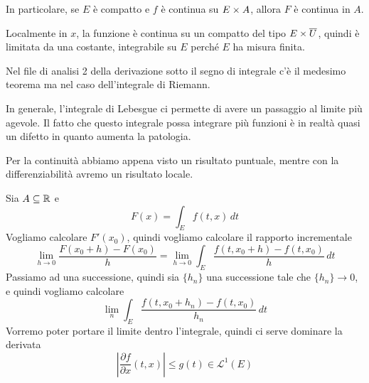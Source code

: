 \documentclass[a4paper]{article}
\begin{document}
\begin{radioactive}
\begin{snippetcorollary}{}
    In particolare, se \(E\) è compatto e \(f\) è continua su \(E\times A\),
    allora \(F\) è continua in \(A\).
\end{snippetcorollary}
\end{radioactive}

\begin{radioactive}
\begin{snippetproof}{}
    Localmente in \(x\), la funzione è continua su un compatto del tipo \(E\times\overline U\), quindi è limitata da una costante, integrabile su \(E\) perché \(E\) ha misura finita.
\end{snippetproof}
\end{radioactive}

\begin{radioactive}
Nel file di analisi 2 della derivazione sotto il segno di integrale c'è il medesimo
teorema ma nel caso dell'integrale di Riemann.
\end{radioactive}

\begin{radioactive}
In generale, l'integrale di Lebesgue
ci permette di avere un passaggio al limite più agevole.
Il fatto che questo integrale possa integrare più funzioni è in realtà quasi un difetto in quanto
aumenta la patologia.
\end{radioactive}

\begin{radioactive}
Per la continuità abbiamo appena visto un risultato puntuale,
mentre con la differenziabilità avremo un risultato locale.
\end{radioactive}

\begin{radioactive}
Sia \(A \subseteq \mathbb{R}\) e \[
    F(x) = \int_E f(t,x)\,dt
\]
Vogliamo calcolare \(F'(x_0)\), quindi vogliamo calcolare il rapporto incrementale
\[
    \lim_{h\to 0} \frac{F(x_0 + h)-F(x_0)}{h}
    = \lim_{h\to 0} \int_E \frac{f(t,x_0 + h)-f(t,x_0)}{h}\,dt
\]
Passiamo ad una successione, quindi sia \(\{h_n\}\) una successione tale che \(\{h_n\} \to 0\),
e quindi vogliamo calcolare
\[
    \lim_n \int_E \frac{f(t, x_0 + h_n) - f(t, x_0)}{h_n}\,dt
\]
Vorremo poter portare il limite dentro l'integrale, quindi ci serve dominare la derivata
\[
    \left|
    \frac{\partial f}{\partial x}(t,x)
    \right| \leq g(t) \in \mathcal L^1(E)
\]
\end{radioactive}
\end{document}
